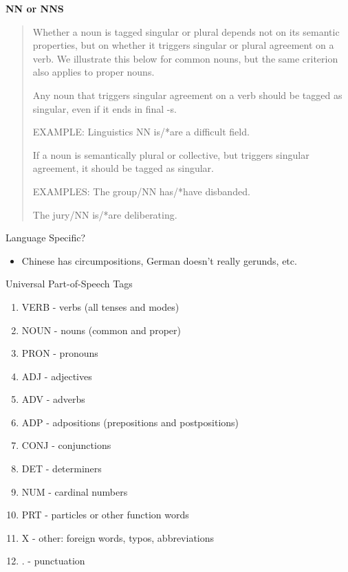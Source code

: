 \documentclass{beamer}
\begin{document}
\begin{frame}


\textbf{NN or NNS}

\begin{quote}
  Whether a noun is tagged singular or plural depends not on its
  semantic properties, but on whether it triggers singular or plural
  agreement on a verb. We illustrate this below for common nouns, but
  the same criterion also applies to proper nouns.

Any noun that triggers singular agreement on a verb should be tagged as singular, even if it ends in final -s.

\air

\textnormal{EXAMPLE: Linguistics NN is/*are a difficult field.}

\air
If a noun is semantically plural or collective, but triggers singular agreement, it should be tagged as
singular.

\air
\textnormal{EXAMPLES: The group/NN has/*have disbanded.}

\textnormal{The jury/NN is/*are deliberating.}

\end{quote}

\end{frame}


\begin{frame}{Language Specific?}
  \begin{itemize}
  \item Chinese has circumpositions, German doesn't really gerunds, etc.
  \end{itemize}
\end{frame}

\begin{frame}{Universal Part-of-Speech Tags}

  \begin{enumerate}
  \item VERB - verbs (all tenses and modes)
  \item NOUN - nouns (common and proper)
  \item PRON - pronouns
  \item ADJ - adjectives
  \item ADV - adverbs
  \item ADP - adpositions (prepositions and postpositions)
  \item CONJ - conjunctions
  \item DET - determiners
  \item NUM - cardinal numbers
  \item PRT - particles or other function words
  \item X - other: foreign words, typos, abbreviations
  \item . - punctuation
\end{enumerate}
\end{frame}
\end{document}
